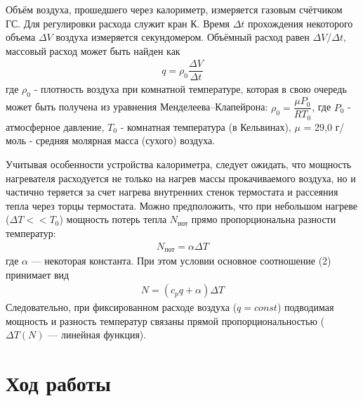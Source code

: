 \documentclass[a4paper, 12pt]{article}%
\begin{document}
Объём воздуха, прошедшего через калориметр, измеряется газовым счётчиком ГС. Для регулировки расхода служит кран К. Время $\Delta t$ прохождения некоторого объема $\Delta V$ воздуха измеряется секундомером. Объёмный расход равен $\Delta V / \Delta t$, массовый расход может быть найден как
\begin{equation}
\begin{aligned}
q = \rho_0 \dfrac{\Delta V}{\Delta t} 
\end{aligned}
\end{equation}
где $\rho_0$ - плотность воздуха при комнатной температуре, которая в свою очередь может быть получена из уравнения Менделеева–Клапейрона: $\rho_0 = \dfrac{\mu P_0}{RT_0}$, где $P_0$ - атмосферное давление, $T_0$ - комнатная температура (в Кельвинах), $\mu$ = 29,0 г/моль - средняя молярная масса (сухого) воздуха.

Учитывая особенности устройства калориметра, следует ожидать, что мощность нагревателя расходуется не только на нагрев массы прокачиваемого воздуха, но и частично теряется за счет нагрева внутренних стенок термостата и рассеяния тепла через торцы термостата. Можно предположить, что при небольшом нагреве ($\Delta T << T_0$) мощность потерь тепла $N_{\text{пот}}$ прямо пропорциональна разности температур:
\begin{equation}
\begin{aligned}
N_{\text{пот}} = \alpha \Delta T
\end{aligned}
\end{equation}
где $\alpha$ — некоторая константа. При этом условии основное соотношение (2) принимает вид
\begin{equation}
\begin{aligned}
N = (c_p q+ \alpha) \Delta T
\end{aligned}
\end{equation}
Следовательно, при фиксированном расходе воздуха ($q = const$) подводимая мощность и разность температур связаны прямой пропорциональностью ($\Delta T (N)$ — линейная функция).
\section*{Ход работы}
\end{document}
